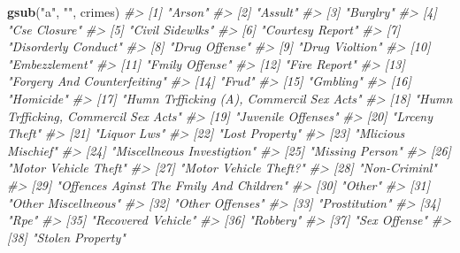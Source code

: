 \documentclass[
  12pt,
]{book}
\newenvironment{Shaded}{\begin{snugshade}}{\end{snugshade}}
\newcommand{\CommentTok}[1]{\textcolor[rgb]{0.56,0.35,0.01}{\textit{#1}}}
\newcommand{\KeywordTok}[1]{\textcolor[rgb]{0.13,0.29,0.53}{\textbf{#1}}}
\newcommand{\NormalTok}[1]{#1}
\newcommand{\StringTok}[1]{\textcolor[rgb]{0.31,0.60,0.02}{#1}}
\begin{document}
\begin{Shaded}
\begin{Highlighting}[]
\KeywordTok{gsub}\NormalTok{(}\StringTok{"a"}\NormalTok{, }\StringTok{""}\NormalTok{, crimes)}
\CommentTok{\#>  [1] "Arson"                                  }
\CommentTok{\#>  [2] "Assult"                                 }
\CommentTok{\#>  [3] "Burglry"                                }
\CommentTok{\#>  [4] "Cse Closure"                            }
\CommentTok{\#>  [5] "Civil Sidewlks"                         }
\CommentTok{\#>  [6] "Courtesy Report"                        }
\CommentTok{\#>  [7] "Disorderly Conduct"                     }
\CommentTok{\#>  [8] "Drug Offense"                           }
\CommentTok{\#>  [9] "Drug Violtion"                          }
\CommentTok{\#> [10] "Embezzlement"                           }
\CommentTok{\#> [11] "Fmily Offense"                          }
\CommentTok{\#> [12] "Fire Report"                            }
\CommentTok{\#> [13] "Forgery And Counterfeiting"             }
\CommentTok{\#> [14] "Frud"                                   }
\CommentTok{\#> [15] "Gmbling"                                }
\CommentTok{\#> [16] "Homicide"                               }
\CommentTok{\#> [17] "Humn Trfficking (A), Commercil Sex Acts"}
\CommentTok{\#> [18] "Humn Trfficking, Commercil Sex Acts"    }
\CommentTok{\#> [19] "Juvenile Offenses"                      }
\CommentTok{\#> [20] "Lrceny Theft"                           }
\CommentTok{\#> [21] "Liquor Lws"                             }
\CommentTok{\#> [22] "Lost Property"                          }
\CommentTok{\#> [23] "Mlicious Mischief"                      }
\CommentTok{\#> [24] "Miscellneous Investigtion"              }
\CommentTok{\#> [25] "Missing Person"                         }
\CommentTok{\#> [26] "Motor Vehicle Theft"                    }
\CommentTok{\#> [27] "Motor Vehicle Theft?"                   }
\CommentTok{\#> [28] "Non{-}Criminl"                            }
\CommentTok{\#> [29] "Offences Aginst The Fmily And Children" }
\CommentTok{\#> [30] "Other"                                  }
\CommentTok{\#> [31] "Other Miscellneous"                     }
\CommentTok{\#> [32] "Other Offenses"                         }
\CommentTok{\#> [33] "Prostitution"                           }
\CommentTok{\#> [34] "Rpe"                                    }
\CommentTok{\#> [35] "Recovered Vehicle"                      }
\CommentTok{\#> [36] "Robbery"                                }
\CommentTok{\#> [37] "Sex Offense"                            }
\CommentTok{\#> [38] "Stolen Property"                        }

\end{Highlighting}
\end{Shaded}
\end{document}
